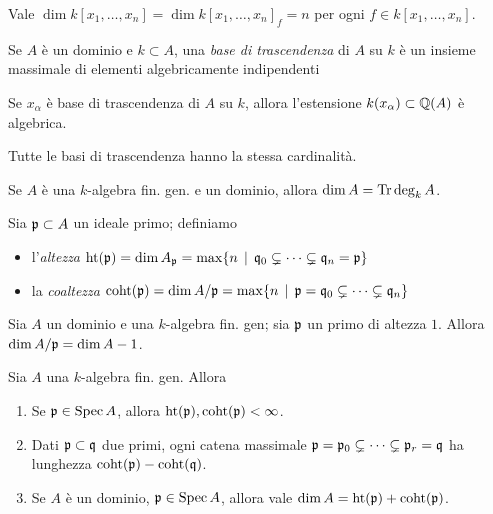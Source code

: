\begin{proposition}
    Vale $\dim k[x_1,\dots,x_n]=\dim k[x_1,\dots,x_n]_f=n$ per ogni $f\in k[x_1,\dots,x_n]$.
\end{proposition}

\begin{definition}
    Se $A$ è un dominio e $k\subset A$, una \emph{base di trascendenza} di $A$ su $k$ è un insieme massimale di elementi algebricamente indipendenti
\end{definition}

\begin{lemma}
    Se $x_\alpha$ è base di trascendenza di $A$ su $k$, allora l'estensione $k(x_\alpha)\subset \mathbb{Q}(A)$ è algebrica.
\end{lemma}

\begin{theorem}
    Tutte le basi di trascendenza hanno la stessa cardinalità.
\end{theorem}

\begin{corollary}
    Se $A$ è una $k$-algebra fin. gen. e un dominio, allora $\dim A=\operatorname{Tr}\deg_k A$.
\end{corollary}


\begin{definition}
    Sia $\mathfrak{p}\subset A$ un ideale primo; definiamo
    \begin{itemize}
        \item l'\emph{altezza} $\operatorname{ht}(\mathfrak{p}) = \dim A_{\mathfrak{p}} = \max \{n\operatorname{\; |\;} \mathfrak{q}_0\subsetneq\dots\subsetneq\mathfrak{q}_n=\mathfrak{p}  \}$
        \item la \emph{coaltezza} $\operatorname{coht}(\mathfrak{p}) = \dim A / \mathfrak{p} = \max \{n\operatorname{\; |\;} \mathfrak{p} = \mathfrak{q}_0\subsetneq\dots\subsetneq\mathfrak{q}_n  \}$
    \end{itemize}
\end{definition}

\begin{lemma}
    Sia $A$ un dominio e una $k$-algebra fin. gen; sia $\mathfrak{p}$ un primo di altezza $1$. Allora $\dim A / \mathfrak{p}=\dim A - 1$.
\end{lemma}

\begin{theorem}
    Sia $A$ una $k$-algebra fin. gen. Allora
    \begin{enumerate}
        \item Se $\mathfrak{p}\in\operatorname{Spec} A$, allora $\operatorname{ht}(\mathfrak{p}),\operatorname{coht}(\mathfrak{p})<\infty$.
        \item Dati $\mathfrak{p}\subset\mathfrak{q}$ due primi, ogni catena massimale $\mathfrak{p}=\mathfrak{p}_0\subsetneq\dots\subsetneq\mathfrak{p}_r=\mathfrak{q}$ ha lunghezza $\operatorname{coht}(\mathfrak{p})-\operatorname{coht}(\mathfrak{q})$.
        \item Se $A$ è un dominio, $\mathfrak{p}\in\operatorname{Spec} A$, allora vale $\dim A = \operatorname{ht}(\mathfrak{p})+\operatorname{coht}(\mathfrak{p})$.
    \end{enumerate}
\end{theorem}

